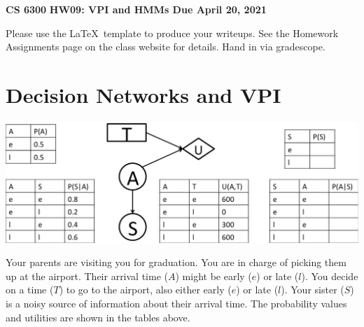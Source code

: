 \documentclass[12pt]{article}
\begin{document}
\begin{center}
{\bf CS 6300} \hfill {\large\bf HW09: VPI and HMMs \hfill Due April 20, 2021}
\end{center}

\noindent
Please use the \LaTeX\ template to produce your writeups. See the
Homework Assignments page on the class website for details.  Hand in
via gradescope.

\section{Decision Networks and VPI}

\begin{center}
\includegraphics[width=6in]{influence-diagram-w-additional-tables.eps}
\end{center}

Your parents are visiting you for graduation.  You are in charge of
picking them up at the airport.  Their arrival time ($A$) might be
early ($e$) or late ($l$).  You decide on a time ($T$) to go to the
airport, also either early ($e$) or late ($l$).  Your sister ($S$) is
a noisy source of information about their arrival time. The
probability values and utilities are shown in the tables above.
\end{document}
